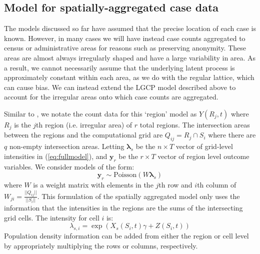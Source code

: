 \subsection{Model for spatially-aggregated case data}
The models discussed so far have assumed that the precise location of each case is known. However, in many cases we will have instead case counts aggregated to census or administrative areas for reasons such as preserving anonymity. These areas are almost always irregularly shaped and have a large variability in area. As a result, we cannot necessarily assume that the underlying latent process is approximately constant within each area, as we do with the regular lattice, which can cause bias. We can instead extend the LGCP model described above to account for the irregular areas onto which case counts are aggregated.  

Similar to \citet{Li2012}, we notate the count data for this `region' model as $Y(R_j,t)$ where $R_j$ is the $j$th region (i.e. irregular area) of $r$ total regions. The intersection areas between the regions and the computational grid are $Q_{ij} = R_j \cap S_i$ where there are $q$ non-empty intersection areas. Letting $\boldsymbol{\lambda}_s$ be the $n \times T$ vector of grid-level intensities in (\ref{eq:fullmodel}), and $\boldsymbol{y}_r$ be the $r \times T$ vector of region level outcome variables. We consider models of the form:
\begin{equation}
    \boldsymbol{y}_r \sim \text{Poisson}(W\boldsymbol{\lambda}_s)
\end{equation}
where $W$ is a weight matrix with elements in the $j$th row and $i$th column of $W_{ji} = \frac{\vert \vert Q_{ij} \vert \vert}{\vert \vert S_i \vert \vert}$. This formulation of the spatially aggregated model only uses the information that the intensities in the regions are the sums of the intersecting grid cells. The intensity for cell $i$ is:
\begin{equation}
\label{eq:intersectionintens}
    \lambda_{s,i} = \exp\left(X_s(S_i,t)\gamma + Z(S_i,t)\right)
\end{equation}
Population density information can be added from either the region or cell level by appropriately multiplying the rows or columns, respectively.

